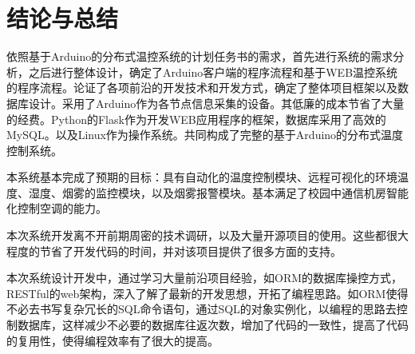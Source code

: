 \section{结论与总结}


依照基于Arduino的分布式温控系统的计划任务书的需求，首先进行系统的需求分析，之后进行整体设计，确定了Arduino客户端的程序流程和基于WEB温控系统的程序流程。论证了各项前沿的开发技术和开发方式，确定了整体项目框架以及数据库设计。采用了Arduino作为各节点信息采集的设备。其低廉的成本节省了大量的经费。Python的Flask作为开发WEB应用程序的框架，数据库采用了高效的MySQL。以及Linux作为操作系统。共同构成了完整的基于Arduino的分布式温度控制系统。

本系统基本完成了预期的目标：具有自动化的温度控制模块、远程可视化的环境温度、湿度、烟雾的监控模块，以及烟雾报警模块。基本满足了校园中通信机房智能化控制空调的能力。

本次系统开发离不开前期周密的技术调研，以及大量开源项目的使用。这些都很大程度的节省了开发代码的时间，并对该项目提供了很多方面的支持。

本次系统设计开发中，通过学习大量前沿项目经验，如ORM的数据库操控方式，RESTful的web架构，深入了解了最新的开发思想，开拓了编程思路。如ORM使得不必去书写复杂冗长的SQL命令语句，通过SQL的对象实例化，以编程的思路去控制数据库，这样减少不必要的数据库往返次数，增加了代码的一致性，提高了代码的复用性，使得编程效率有了很大的提高。


